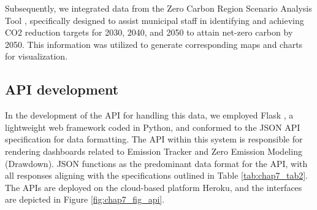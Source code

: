 Subsequently, we integrated data from the Zero Carbon Region Scenario Analysis Tool \citep{zerocarbon}, specifically designed to assist municipal staff in identifying and achieving CO2 reduction targets for 2030, 2040, and 2050 to attain net-zero carbon by 2050. This information was utilized to generate corresponding maps and charts for visualization.\par

\subsection{API development}
In the development of the API for handling this data, we employed Flask \citep{grinberg2018flask}, a lightweight web framework coded in Python, and conformed to the JSON API specification for data formatting. The API within this system is responsible for rendering dashboards related to Emission Tracker and Zero Emission Modeling (Drawdown). JSON functions as the predominant data format for the API, with all responses aligning with the specifications outlined in Table \ref{tab:chap7_tab2}. The APIs are deployed on the cloud-based platform Heroku, and the interfaces are depicted in Figure \ref{fig:chap7_fig_api}. \par


